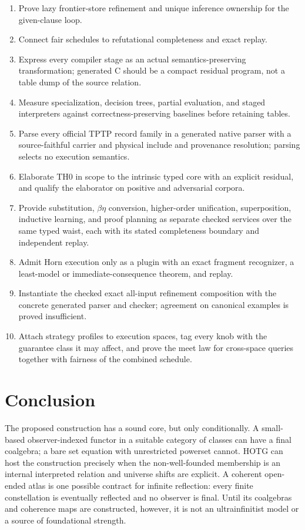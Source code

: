 \documentclass[11pt]{article}
\theoremstyle{definition}
\theoremstyle{remark}
\begin{document}
\begin{enumerate}
\item Prove lazy frontier-store refinement and unique inference ownership for the
  given-clause loop.
\item Connect fair schedules to refutational completeness and exact replay.
\item Express every compiler stage as an actual semantics-preserving
  transformation; generated C should be a compact residual program, not a table
  dump of the source relation.
\item Measure specialization, decision trees, partial evaluation, and staged
  interpreters against correctness-preserving baselines before retaining tables.
\item Parse every official TPTP record family in a generated native parser with
  a source-faithful carrier and physical include and provenance resolution;
  parsing selects no execution semantics.
\item Elaborate TH0 in scope to the intrinsic typed core with an explicit
  residual, and qualify the elaborator on positive and adversarial corpora.
\item Provide substitution, $\beta\eta$ conversion, higher-order unification,
  superposition, inductive learning, and proof planning as separate checked
  services over the same typed waist, each with its stated completeness
  boundary and independent replay.
\item Admit Horn execution only as a plugin with an exact fragment recognizer,
  a least-model or immediate-consequence theorem, and replay.
\item Instantiate the checked exact all-input refinement composition with the
  concrete generated parser and checker; agreement on canonical examples is
  proved insufficient.
\item Attach strategy profiles to execution spaces, tag every knob with the
  guarantee class it may affect, and prove the meet law for cross-space
  queries together with fairness of the combined schedule.
\end{enumerate}

\section{Conclusion}

The proposed construction has a sound core, but only conditionally.  A
small-based observer-indexed functor in a suitable category of classes can have a
final coalgebra; a bare set equation with unrestricted powerset cannot.  HOTG can
host the construction precisely when the non-well-founded membership is an
internal interpreted relation and universe shifts are explicit.  A coherent
open-ended atlas is one possible contract for infinite reflection: every finite
constellation is eventually reflected and no observer is final.  Until its
coalgebras and coherence maps are constructed, however, it is not an
ultrainfinitist model or a source of foundational strength.
\end{document}

